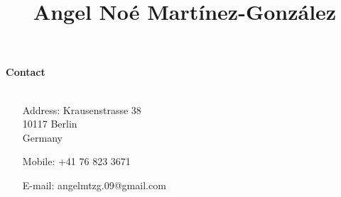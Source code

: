 \documentclass[10 pt]{article}
\title{\textbf{Angel Noé Martínez-González}}
\date{}
\newcommand{\mypartitle}[2][2.]{\vspace*{-#1 ex}~\\{\noindent {\bf #2}}}
\begin{document}
\maketitle
\vspace{-1.5cm}
\hspace{-.5cm}\textbf{Contact}\\

\vspace{-0.3cm}
\ \ \ \ \ \begin{minipage}{0.5\linewidth}

\begin{itemize}[noitemsep]

\item[Address:] Krausenstrasse 38\\
 10117 Berlin\\
 Germany

\end{itemize}

\end{minipage}\begin{minipage}{0.3\linewidth}

\begin{itemize}[noitemsep]

\item[Mobile:] +41 76 823 3671
\item[E-mail:] angelmtzg.09@gmail.com

\end{itemize}

\end{minipage}

\bigskip


%
%
%
%
\end{document}
